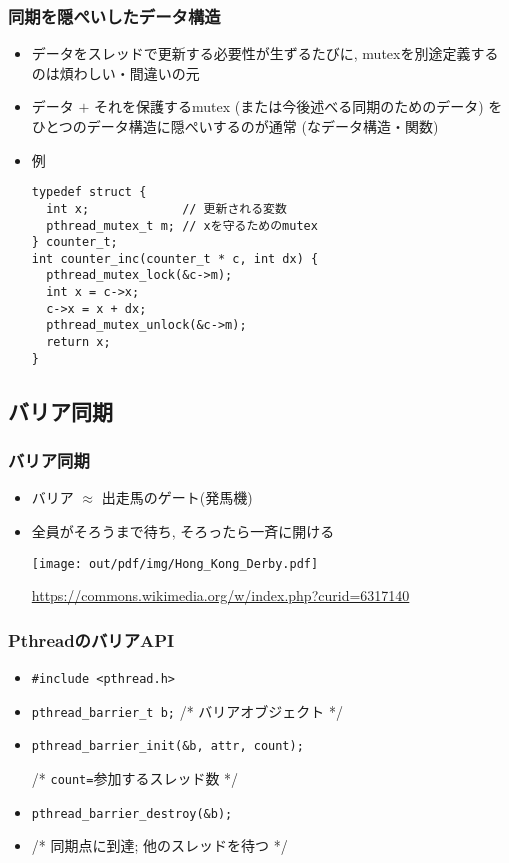 \documentclass[12pt,dvipdfmx]{beamer}
\begin{document}
\begin{frame}[fragile]
  \frametitle{同期を隠ぺいしたデータ構造}
  \begin{itemize}
  \item データをスレッドで更新する必要性が生ずるたびに,
    mutexを別途定義するのは煩わしい・間違いの元
  \item データ $+$ それを保護するmutex (または今後述べる同期のためのデータ)
    をひとつのデータ構造に隠ぺいするのが通常
    (なデータ構造・関数)
  \item 例
\begin{lstlisting}
typedef struct {
  int x;             // 更新される変数
  pthread_mutex_t m; // xを守るためのmutex
} counter_t;
int counter_inc(counter_t * c, int dx) {
  pthread_mutex_lock(&c->m);
  int x = c->x;
  c->x = x + dx;
  pthread_mutex_unlock(&c->m);
  return x;
}
\end{lstlisting}
\end{itemize}
\end{frame}

\subsection{バリア同期}
\begin{frame}
  \frametitle{バリア同期}
  \begin{itemize}
  \item バリア $\approx$ 出走馬のゲート(発馬機)
  \item 全員がそろうまで待ち, そろったら一斉に開ける
    \begin{center}
\texttt{[image: out/pdf/img/Hong\_Kong\_Derby.pdf]}

{\tiny\url{https://commons.wikimedia.org/w/index.php?curid=6317140}}
\end{center}
\end{itemize}
\end{frame}

\begin{frame}
  \frametitle{PthreadのバリアAPI}
  \begin{itemize}
  \item {\tt \#include <pthread.h>}
  \item {\tt pthread\_barrier\_t b;}  /* バリアオブジェクト */
  \item {\tt pthread\_barrier\_init(\&b, attr, count);}

    /* {\tt count=}参加するスレッド数 */
  \item {\tt pthread\_barrier\_destroy(\&b);}
  \item {}

    /* 同期点に到達; 他のスレッドを待つ */
  \end{itemize}
\end{frame}
\end{document}
